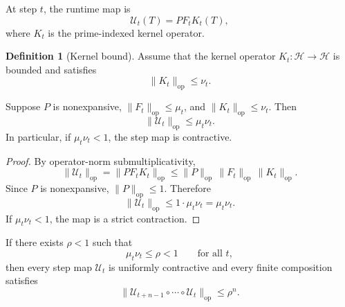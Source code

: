 \documentclass[12pt,a4paper]{article}
\theoremstyle{definition}
\newtheorem{definition}{Definition}[section]
\theoremstyle{plain}
\theoremstyle{remark}
\begin{document}
At step $t$, the runtime map is
\begin{equation}
\mathcal{U}_t(T) = P F_t K_t(T),
\end{equation}
where $K_t$ is the prime-indexed kernel operator.

\begin{definition}[Kernel bound]
Assume that the kernel operator $K_t : \mathcal{H} \to \mathcal{H}$ is bounded and
satisfies
\begin{equation}
\|K_t\|_{\mathrm{op}} \le \nu_t.
\end{equation}
\end{definition}

\begin{proposition}
Suppose $P$ is nonexpansive, $\|F_t\|_{\mathrm{op}} \le \mu_t$, and
$\|K_t\|_{\mathrm{op}} \le \nu_t$. Then
\begin{equation}
\|\mathcal{U}_t\|_{\mathrm{op}} \le \mu_t \nu_t.
\end{equation}
In particular, if $\mu_t\nu_t < 1$, the step map is contractive.
\end{proposition}

\begin{proof}
By operator-norm submultiplicativity,
\begin{equation}
\|\mathcal{U}_t\|_{\mathrm{op}} = \|P F_t K_t\|_{\mathrm{op}}
\le \|P\|_{\mathrm{op}}\,\|F_t\|_{\mathrm{op}}\,\|K_t\|_{\mathrm{op}}.
\end{equation}
Since $P$ is nonexpansive, $\|P\|_{\mathrm{op}}\le 1$. Therefore
\begin{equation}
\|\mathcal{U}_t\|_{\mathrm{op}} \le 1\cdot \mu_t \nu_t = \mu_t\nu_t.
\end{equation}
If $\mu_t\nu_t<1$, the map is a strict contraction.
\end{proof}

\begin{corollary}
If there exists $\rho<1$ such that
\begin{equation}
\mu_t\nu_t \le \rho < 1 \qquad \text{for all } t,
\end{equation}
then every step map $\mathcal{U}_t$ is uniformly contractive and every finite
composition satisfies
\begin{equation}
\|\mathcal{U}_{t+n-1}\circ \cdots \circ \mathcal{U}_t\|_{\mathrm{op}} \le \rho^n.
\end{equation}
\end{corollary}
\end{document}
